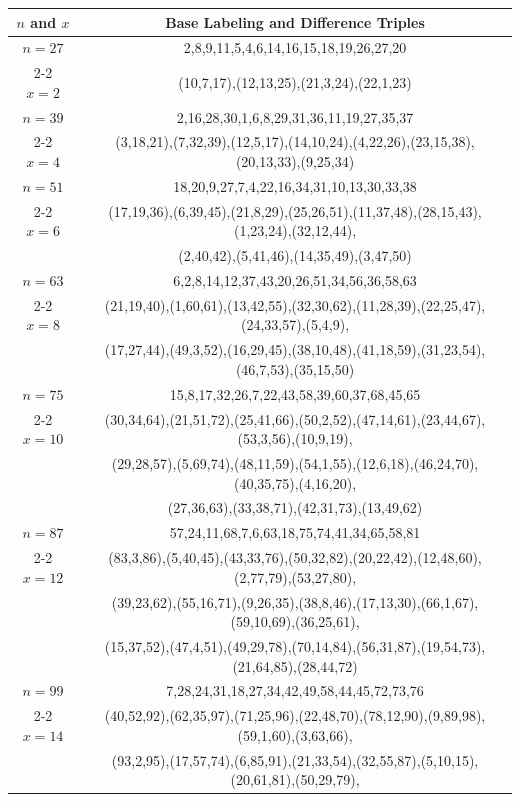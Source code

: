 \begin{tabular}{| c | c |}
\hline
\(n\) and \(x\) & Base Labeling and Difference Triples\\
\hline
\(n=27\) & 
2,8,9,11,5,4,6,14,16,15,18,19,26,27,20\\
\cline{2-2}
\(x=2\)
&(10,7,17),(12,13,25),(21,3,24),(22,1,23)\\
\hline 
\(n=39\) & 
2,16,28,30,1,6,8,29,31,36,11,19,27,35,37\\
\cline{2-2}
\(x=4\)
&(3,18,21),(7,32,39),(12,5,17),(14,10,24),(4,22,26),(23,15,38),(20,13,33),(9,25,34)\\
\hline 
\(n=51\) & 
18,20,9,27,7,4,22,16,34,31,10,13,30,33,38\\
\cline{2-2}
\(x=6\)
&(17,19,36),(6,39,45),(21,8,29),(25,26,51),(11,37,48),(28,15,43),(1,23,24),(32,12,44),\\
&(2,40,42),(5,41,46),(14,35,49),(3,47,50)\\
\hline 
\(n=63\) & 
6,2,8,14,12,37,43,20,26,51,34,56,36,58,63\\
\cline{2-2}
\(x=8\)
&(21,19,40),(1,60,61),(13,42,55),(32,30,62),(11,28,39),(22,25,47),(24,33,57),(5,4,9),\\
&(17,27,44),(49,3,52),(16,29,45),(38,10,48),(41,18,59),(31,23,54),(46,7,53),(35,15,50)\\
\hline 
\(n=75\) & 
15,8,17,32,26,7,22,43,58,39,60,37,68,45,65\\
\cline{2-2}
\(x=10\)
&(30,34,64),(21,51,72),(25,41,66),(50,2,52),(47,14,61),(23,44,67),(53,3,56),(10,9,19),\\
&(29,28,57),(5,69,74),(48,11,59),(54,1,55),(12,6,18),(46,24,70),(40,35,75),(4,16,20),\\
&(27,36,63),(33,38,71),(42,31,73),(13,49,62)\\
\hline 
\(n=87\) & 
57,24,11,68,7,6,63,18,75,74,41,34,65,58,81\\
\cline{2-2}
\(x=12\)
&(83,3,86),(5,40,45),(43,33,76),(50,32,82),(20,22,42),(12,48,60),(2,77,79),(53,27,80),\\
&(39,23,62),(55,16,71),(9,26,35),(38,8,46),(17,13,30),(66,1,67),(59,10,69),(36,25,61),\\
&(15,37,52),(47,4,51),(49,29,78),(70,14,84),(56,31,87),(19,54,73),(21,64,85),(28,44,72)\\
\hline 
\(n=99\) & 
7,28,24,31,18,27,34,42,49,58,44,45,72,73,76\\
\cline{2-2}
\(x=14\)
&(40,52,92),(62,35,97),(71,25,96),(22,48,70),(78,12,90),(9,89,98),(59,1,60),(3,63,66),\\
&(93,2,95),(17,57,74),(6,85,91),(21,33,54),(32,55,87),(5,10,15),(20,61,81),(50,29,79),\\

\end{tabular}
